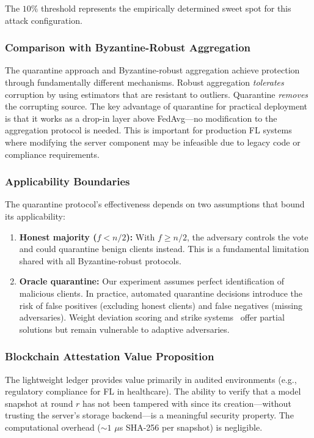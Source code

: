 \documentclass[conference]{IEEEtran}
\begin{document}
The $10\%$ threshold represents the empirically determined sweet spot for this attack configuration.

\subsubsection{Comparison with Byzantine-Robust Aggregation}
The quarantine approach and Byzantine-robust aggregation achieve protection through fundamentally different mechanisms. Robust aggregation \emph{tolerates} corruption by using estimators that are resistant to outliers. Quarantine \emph{removes} the corrupting source. The key advantage of quarantine for practical deployment is that it works as a drop-in layer above FedAvg—no modification to the aggregation protocol is needed. This is important for production FL systems where modifying the server component may be infeasible due to legacy code or compliance requirements.

\subsubsection{Applicability Boundaries}
The quarantine protocol's effectiveness depends on two assumptions that bound its applicability:

\begin{enumerate}
    \item \textbf{Honest majority ($f < n/2$):} With $f \geq n/2$, the adversary controls the vote and could quarantine benign clients instead. This is a fundamental limitation shared with all Byzantine-robust protocols.
    \item \textbf{Oracle quarantine:} Our experiment assumes perfect identification of malicious clients. In practice, automated quarantine decisions introduce the risk of false positives (excluding honest clients) and false negatives (missing adversaries). Weight deviation scoring and strike systems~\cite{li2020flguard} offer partial solutions but remain vulnerable to adaptive adversaries.
\end{enumerate}

\subsubsection{Blockchain Attestation Value Proposition}
The lightweight ledger provides value primarily in audited environments (e.g., regulatory compliance for FL in healthcare). The ability to verify that a model snapshot at round $r$ has not been tampered with since its creation—without trusting the server's storage backend—is a meaningful security property. The computational overhead ($\sim 1$ $\mu$s SHA-256 per snapshot) is negligible.
\end{document}
